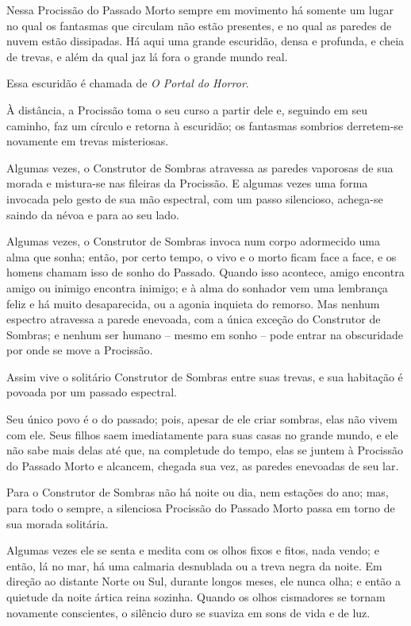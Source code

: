 Nessa Procissão do Passado Morto sempre em movimento há somente um lugar
no qual os fantasmas que circulam não estão presentes, e no qual as
paredes de nuvem estão dissipadas. Há aqui uma grande escuridão, densa e
profunda, e cheia de trevas, e além da qual jaz lá fora o grande mundo
real.

Essa escuridão é chamada de \emph{O Portal do Horror}.

À distância, a Procissão toma o seu curso a partir dele e, seguindo em
seu caminho, faz um círculo e retorna à escuridão; os fantasmas sombrios
derretem-se novamente em trevas misteriosas.

Algumas vezes, o Construtor de Sombras atravessa as paredes vaporosas de
sua morada e mistura-se nas fileiras da Procissão. E algumas vezes uma
forma invocada pelo gesto de sua mão espectral, com um passo silencioso,
achega-se saindo da névoa e para ao seu lado.


Algumas vezes,
o Construtor de Sombras invoca num corpo adormecido uma alma que sonha;
então, por certo tempo, o vivo e o morto ficam face a face, e os homens
chamam isso de sonho do Passado. Quando isso acontece, amigo encontra
amigo ou inimigo encontra inimigo; e à alma do sonhador vem uma
lembrança feliz e há muito desaparecida, ou a agonia inquieta do
remorso. Mas nenhum espectro atravessa a parede enevoada, com a única
exceção do Construtor de Sombras; e nenhum ser humano -- mesmo em sonho
-- pode entrar na obscuridade por onde se move a Procissão.

Assim vive o solitário Construtor de Sombras entre suas trevas, e sua
habitação é povoada por um passado espectral.

Seu único povo é o do passado; pois, apesar de ele criar sombras, elas
não vivem com ele. Seus filhos saem imediatamente para suas casas no
grande mundo, e ele não sabe mais delas até que, na completude do tempo,
elas se juntem à Procissão do Passado Morto e alcancem, chegada sua vez,
as paredes enevoadas de seu lar.

Para o Construtor de Sombras não há noite ou dia, nem estações do ano;
mas, para todo o sempre, a silenciosa Procissão do Passado Morto passa
em torno de sua morada solitária.

Algumas vezes ele se senta e medita com os olhos fixos e fitos, nada
vendo; e então, lá no mar, há uma calmaria desnublada ou a treva negra
da noite. Em direção ao distante Norte ou Sul, durante longos meses, ele
nunca olha; e então a quietude da noite ártica reina sozinha. Quando os
olhos cismadores se tornam novamente conscientes, o silêncio duro se
suaviza em sons de vida e de luz.

